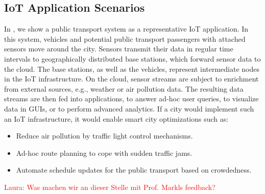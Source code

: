 \subsection{IoT Application Scenarios}
In , we show a public transport system as a representative IoT application. 
In this system, vehicles and potential public transport passengers with attached sensors move around the city.
Sensors transmit their data in regular time intervals to geographically distributed base stations, which forward sensor data to the cloud. 
The base stations, as well as the vehicles, represent intermediate nodes in the IoT infrastructure.
On the cloud, sensor streams are subject to enrichment from external sources, e.g., weather or air pollution data.
The resulting data streams are then fed into applications, to answer ad-hoc user queries, to visualize data in GUIs, or to perform advanced analytics.
If a city would implement such an IoT infrastructure, it would enable smart city optimizations such as:
\begin{itemize} 
	\item Reduce air pollution by traffic light control mechanisms.
	\item Ad-hoc route planning to cope with sudden traffic jams.
	\item Automate schedule updates for the public transport based on crowdedness.
\end{itemize}
\textcolor{red}{Laura: Was machen wir an dieser Stelle mit Prof. Markls feedback?}
% 

